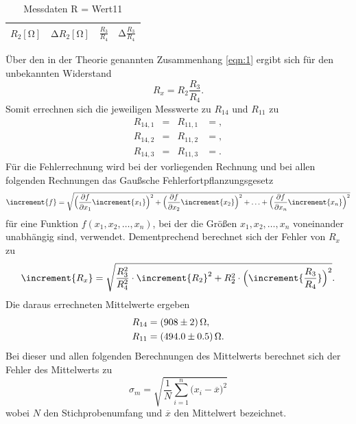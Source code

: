 \begin{table}
  \centering
  \caption{Messdaten R = Wert11}
  \label{tab:2}
  \begin{tabular}{c c c c}
    \toprule
    {$R_2 [\si{\ohm}]$} & {$\increment R_2 [\si{\ohm}]$} & {$\frac{R_3}{R_4}$} & {$\increment \frac{R_3}{R_4}$} \\
    \midrule
    
    \bottomrule
  \end{tabular}
\end{table}
Über den in der Theorie genannten Zusammenhang \ref{eqn:1} ergibt sich für den unbekannten Widerstand
\begin{equation}
  R_x = R_2 \frac{R_3}{R_4}.
\end{equation}
Somit errechnen sich die jeweiligen Messwerte zu $R_{14}$ und $R_{11}$ zu
\begin{align*}
  R_{14,1}   &=  & R_{11,1} &= ,\\
  R_{14,2}   &=  & R_{11,2} &= ,\\
  R_{14,3}   &=  & R_{11,3} &= .
\end{align*}
Für die Fehlerrechnung wird bei der vorliegenden Rechnung und bei allen folgenden Rechnungen das Gaußsche Fehlerfortpflanzungsgesetz
\begin{equation}
\increment{f} = \sqrt{\Bigl(\frac{\partial f}{\partial x_1}\increment{x_1}\Bigr)^2 + \Bigl(\frac{\partial f}{\partial x_2}\increment{x_2}\Bigr)^2 + \dotsc + \Bigl(\frac{\partial f}{\partial x_n}\increment{x_n}\Bigr)^2}
\end{equation}
für eine Funktion $f(x_1,x_2, \dotsc ,x_n)$, bei der die Größen $x_1, x_2, \dotsc , x_n$ voneinander unabhängig sind, verwendet.
Dementprechend berechnet sich der Fehler von $R_x$ zu
\begin{equation}
\increment{R_x} = \sqrt{\frac{R_3^2}{R_4^2} \cdot \increment{R_2}^2 + R_2^2 \cdot \Bigl(\increment{\frac{R_3}{R_4} }\Bigr)^2}.
  \label{eqn:fehler1}
\end{equation}
Die daraus errechneten Mittelwerte ergeben
\begin{align*}
  R_{14}   &= \SI{908 +- 2}{\ohm},\\
  R_{11}   &= \SI{494 +- 0.5}{\ohm}.
\end{align*}
Bei dieser und allen folgenden Berechnungen des Mittelwerts berechnet sich der Fehler des Mittelwerts zu
\begin{equation}
 \sigma_m = \sqrt{\frac{1}{N} \sum_{i=1}^n \bigl(x_i - \overline{x} \bigr)^2 }
\end{equation}
wobei $N$ den Stichprobenumfang und $\overline{x}$ den Mittelwert bezeichnet.

